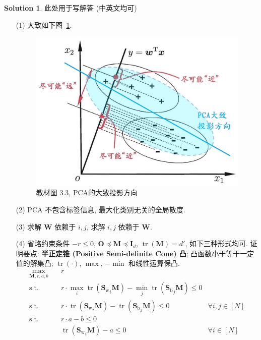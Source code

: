 \documentclass[a4paper]{article}
\numberwithin{equation}{section}
\theoremstyle{definition}
\newtheorem*{solution}{Solution}
\def \Sw {\mathbf{S}_{\operatorname{w}}}
\def \Sb {\mathbf{S}_{\operatorname{b}}}
\def \O {\mathbf{O}}
\def \I {\mathbf{I}}
\def \M {\mathbf{M}}
\def \W {\mathbf{W}}
\newcommand\sbr[1]{\left( #1 \right)}
\newcommand\tr[1]{\operatorname{tr}\sbr{#1}}
\begin{document}
\begin{solution}
    此处用于写解答 (中英文均可)
    \begin{itemize}
        \item[(1)] 大致如下图~\ref{textbook_fig_3_3_pca}.
              \begin{figure}[htbp]
                  \centering
                  \includegraphics[width=0.5\linewidth]{textbook-fig3.3-pca.jpg}
                  \caption{教材图 3.3, PCA的大致投影方向}
                  \label{textbook_fig_3_3_pca}
              \end{figure}
        \item[(2)] PCA 不包含标签信息, 最大化类别无关的全局散度.
        \item[(3)] 求解 $\W$ 依赖于 $i,j$, 求解 $i,j$ 依赖于 $\W$.
        \item[(4)] 省略约束条件 $- r \leqslant 0$, $\O \preccurlyeq \M \preccurlyeq \I_{d}$, $\tr{\M} = d'$, 如下三种形式均可.
              证明要点: \textbf{半正定锥 (Positive Semi-definite Cone) 凸}; 凸函数小于等于一定值的解集凸; $\tr{\cdot}$, $\max$, $-\min$ 和线性运算保凸.
              $$
                  \begin{aligned}
                      \max_{\M,r,a,b} \quad     & r                                                                                         \\
                      \operatorname{s.t.} \quad & r \cdot \max_i \tr{{\Sw}_i \M} - \min_j \tr{{\Sb}_j \M} \leqslant 0                       \\
                      \operatorname{s.t.} \quad & r \cdot \tr{{\Sw}_i \M} - \tr{{\Sb}_j \M} \leqslant 0               & \forall i,j \in [N] \\
                      \operatorname{s.t.} \quad & r \cdot a - b \leqslant 0                                                                 \\
                      \quad                     & \tr{{\Sw}_i \M} - a \leqslant 0                                     & \forall i \in [N]   \\

\end{aligned}$$
\end{itemize}
\end{solution}
\end{document}
